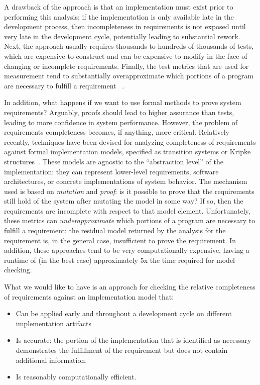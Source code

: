A drawback of the approach is that an implementation must exist prior to performing this analysis; if the implementation is only available late in the development process, then incompleteness in requirements is not exposed until very late in the development cycle, potentially leading to substantial rework.  Next, the approach usually requires thousands to hundreds of thousands of tests, which are expensive to construct and can be expensive to modify in the face of changing or incomplete requirements.  Finally, the test metrics that are used for measurement tend to substantially overapproximate which portions of a program are necessary to fulfill a requirement~\cite{} .

In addition, what happens if we want to use formal methods to prove system requirements?  Arguably, proofs should lead to higher assurance than tests, leading to more confidence in system performance.  However, the problem of requirements completeness becomes, if anything, more critical.  Relatively recently, 
%
%
techniques have been devised for analyzing completeness of requirements against formal implementation models, specified as transition systems or Kripke structures~\cite{}.  These models are agnostic to the ``abstraction level'' of the implementation: they can represent lower-level requirements, software architectures, or concrete implementations of system behavior.  The mechanism used is based on {\em mutation} and {\em proof}: is it possible to prove that the requirements still hold of the system after mutating the model in some way?  If so, then the requirements are incomplete with respect to that model element.  Unfortunately, these metrics can {\em underapproximate} which portions of a program are necessary to fulfill a requirement: the residual model returned by the analysis for the requirement is, in the general case, insufficient to prove the requirement.  In addition, these approaches tend to be very computationally expensive, having a runtime of (in the best case) approximately 5x the time required for model checking.

What we would like to have is an approach for checking the relative completeness of requirements against an implementation model that:
\begin{itemize}
    \item Can be applied early and throughout a development cycle on different implementation artifacts
    \item Is accurate: the portion of the implementation that is identified as necessary demonstrates the 
        fulfillment of the requirement but does not contain additional information.
    \item Is reasonably computationally efficient. 
\end{itemize}     

